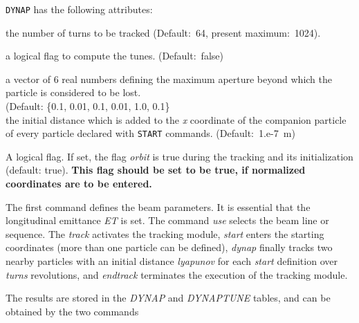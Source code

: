 \texttt{DYNAP} has the following attributes: 
\begin{madlist}
    the number of turns to be tracked (Default:~64,
   present maximum:~1024). 
     
    a logical flag to compute the tunes. (Default:~false)
 
    a vector of 6 real numbers defining the maximum
   aperture beyond which the particle is considered to be lost.\\
   (Default: \{0.1, 0.01, 0.1, 0.01, 1.0, 0.1\} \\
     
    the initial distance which is added to the
   \textit{x} coordinate of the companion particle of every particle
   declared with \texttt{START} commands. (Default:~1.e-7~m)
     
    A logical flag. If set, the flag \textit{orbit} 
   is true during the tracking and its initialization
   (default: true).
   \textbf{ This flag should be set to be true, if 
     normalized coordinates are to be entered.}
\end{madlist}


The first command defines the beam parameters. It is  essential that the
longitudinal emittance \textit{ET} is set. The command \textit{use}
selects the beam line or sequence. The \textit{track} activates the
tracking module, \textit{start } enters the starting coordinates (more
than one particle can be defined),  \textit{dynap} finally tracks two
nearby particles  with an initial distance \textit{lyapunov}  for each
\textit{start} definition over \textit{ turns } revolutions, and
\textit{endtrack} terminates the execution of the tracking module. 

The results are stored in the \textit{DYNAP} and \textit{DYNAPTUNE}
tables, and can be obtained by the two commands  
 

